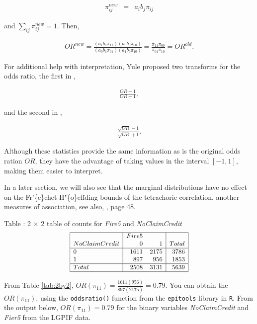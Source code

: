 \documentclass[]{book}
\theoremstyle{definition}
\theoremstyle{definition}
\theoremstyle{definition}
\theoremstyle{remark}
\begin{document}
\begin{eqnarray*}
\pi_{ij}^{new} &=& a_i b_j \pi_{ij}
\end{eqnarray*}

and \(\sum_{ij} \pi_{ij}^{new}=1.\) Then,

\begin{eqnarray*}
OR^{new} = \frac{(a_1 b_1 \pi_{11})( a_0 b_0 \pi_{00})}{(a_0 b_1 \pi_{01})( a_1 b_0\pi_{10})}
= \frac{\pi_{11} \pi_{00}}{\pi_{01} \pi_{10}} =OR^{old} .
\end{eqnarray*}

For additional help with interpretation, Yule proposed two transforms
for the odds ratio, the first in \citep{yule1900association},

\begin{eqnarray*}
\frac{OR-1}{OR+1},
\end{eqnarray*}

and the second in \citep{yule1912methods},

\begin{eqnarray*}
\frac{\sqrt{OR}-1}{\sqrt{OR}+1}.
\end{eqnarray*}

Although these statistics provide the same information as is the
original odds ration \(OR\), they have the advantage of taking values in
the interval \([-1,1]\), making them easier to interpret.

In a later section, we will also see that the marginal distributions
have no effect on the Fr'\{e\}chet-H"\{o\}effding bounds of the
tetrachoric correlation, another measures of association, see also,
\citep{joe2014dependence}, page 48.

Table : \label{tab:2by2} 2 \(\times\) 2 table of counts for \emph{Fire5} and
\emph{NoClaimCredit} \[
{\small \begin{matrix}
\begin{array}{|l|rr|r|} 
    \hline
                  & Fire5 & & \\
NoClaimCredit & 0     & 1     & Total \\
  \hline
           0  & 1611  & 2175  & 3786 \\
           1  & 897   & 956   & 1853 \\
    \hline
    Total    & 2508  & 3131  & 5639 \\
   \hline
\end{array}
\end{matrix}}
\]

From Table \ref{tab:2by2},
\(OR(\pi_{11})=\frac{1611(956)}{897(2175)}=0.79\). You can obtain the
\(OR(\pi_{11})\), using the \texttt{oddsratio()} function from the
\texttt{epitools} library in \texttt{R}. From the output below,
\(OR(\pi_{11})=0.79\) for the binary variables \emph{NoClaimCredit} and
\emph{Fier5} from the LGPIF data.
\end{document}
